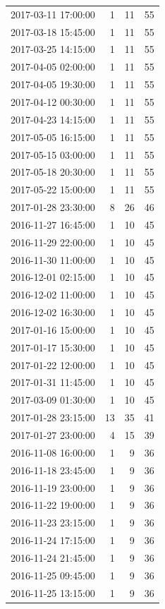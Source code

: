 \begin{tabular}{lrrr}
2017-03-11 17:00:00 & 1 & 11 & 55 \\
2017-03-18 15:45:00 & 1 & 11 & 55 \\
2017-03-25 14:15:00 & 1 & 11 & 55 \\
2017-04-05 02:00:00 & 1 & 11 & 55 \\
2017-04-05 19:30:00 & 1 & 11 & 55 \\
2017-04-12 00:30:00 & 1 & 11 & 55 \\
2017-04-23 14:15:00 & 1 & 11 & 55 \\
2017-05-05 16:15:00 & 1 & 11 & 55 \\
2017-05-15 03:00:00 & 1 & 11 & 55 \\
2017-05-18 20:30:00 & 1 & 11 & 55 \\
2017-05-22 15:00:00 & 1 & 11 & 55 \\
2017-01-28 23:30:00 & 8 & 26 & 46 \\
2016-11-27 16:45:00 & 1 & 10 & 45 \\
2016-11-29 22:00:00 & 1 & 10 & 45 \\
2016-11-30 11:00:00 & 1 & 10 & 45 \\
2016-12-01 02:15:00 & 1 & 10 & 45 \\
2016-12-02 11:00:00 & 1 & 10 & 45 \\
2016-12-02 16:30:00 & 1 & 10 & 45 \\
2017-01-16 15:00:00 & 1 & 10 & 45 \\
2017-01-17 15:30:00 & 1 & 10 & 45 \\
2017-01-22 12:00:00 & 1 & 10 & 45 \\
2017-01-31 11:45:00 & 1 & 10 & 45 \\
2017-03-09 01:30:00 & 1 & 10 & 45 \\
2017-01-28 23:15:00 & 13 & 35 & 41 \\
2017-01-27 23:00:00 & 4 & 15 & 39 \\
2016-11-08 16:00:00 & 1 & 9 & 36 \\
2016-11-18 23:45:00 & 1 & 9 & 36 \\
2016-11-19 23:00:00 & 1 & 9 & 36 \\
2016-11-22 19:00:00 & 1 & 9 & 36 \\
2016-11-23 23:15:00 & 1 & 9 & 36 \\
2016-11-24 17:15:00 & 1 & 9 & 36 \\
2016-11-24 21:45:00 & 1 & 9 & 36 \\
2016-11-25 09:45:00 & 1 & 9 & 36 \\
2016-11-25 13:15:00 & 1 & 9 & 36 \\

\end{tabular}
